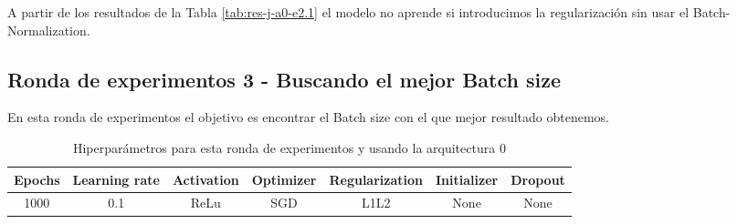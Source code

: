 \documentclass{article}
\begin{document}
		    A partir de los resultados de la Tabla \ref{tab:res-j-a0-e2.1} el modelo no aprende si introducimos la regularizaci\'on sin usar el Batch-Normalization.
      
     
    \subsection{Ronda de experimentos 3 - Buscando el mejor Batch size}
		\label{j-s-a0-e3} %
			En esta ronda de experimentos el objetivo es encontrar el Batch size con el que mejor resultado obtenemos.
            
			\begin{table}[h!]
				\begin{center}
					\begin{tabular}{| c | c | c | c | c | c | c |}
						\textbf{Epochs} & \textbf{Learning rate} & \textbf{Activation} & \textbf{Optimizer} & \textbf{Regularization} & \textbf{Initializer} & \textbf{Dropout}\\ \hline
						1000 & 0.1 & ReLu & SGD & L1L2 & None & None
					\end{tabular}
					\caption{Hiperpar\'ametros para esta ronda de experimentos y usando la arquitectura 0}
					\label{tab:hip-j-a0-e3}
				\end{center}
			\end{table}
			
\end{document}
